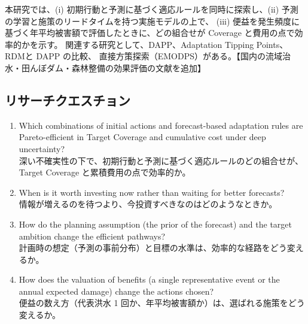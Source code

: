 \documentclass[a4paper,10pt]{ltjsarticle}
\newcommand{\todo}[1]{\textcolor{corange}{【#1】}}
\begin{document}
本研究では、(i) 初期行動と予測に基づく適応ルールを同時に探索し、(ii) 予測の学習と施策のリードタイムを持つ実施モデルの上で、
(iii) 便益を発生頻度に基づく年平均被害額で評価したときに、どの組合せが Coverage と費用の点で効率的かを示す。
関連する研究として、DAPP\cite{haasnoot2013}、Adaptation Tipping Points\cite{kwadijk2010}、RDM\cite{lempert2003}と DAPP の比較\cite{kwakkel2016}、
直接方策探索（EMODPS）\cite{giuliani2016,quinn2017}がある。\todo{国内の流域治水・田んぼダム・森林整備の効果評価の文献を追加}

\subsection{リサーチクエスチョン}
\begin{enumerate}
  \item[RQ1] Which combinations of initial actions and forecast-based adaptation rules are Pareto-efficient in Target Coverage and cumulative cost under deep uncertainty?\\
    深い不確実性の下で、初期行動と予測に基づく適応ルールのどの組合せが、Target Coverage と累積費用の点で効率的か。
  \item[RQ2] When is it worth investing now rather than waiting for better forecasts?\\
    情報が増えるのを待つより、今投資すべきなのはどのようなときか。
  \item[RQ3] How do the planning assumption (the prior of the forecast) and the target ambition change the efficient pathways?\\
    計画時の想定（予測の事前分布）と目標の水準は、効率的な経路をどう変えるか。
  \item[RQ4] How does the valuation of benefits (a single representative event or the annual expected damage) change the actions chosen?\\
    便益の数え方（代表洪水 1 回か、年平均被害額か）は、選ばれる施策をどう変えるか。
\end{enumerate}
\end{document}
